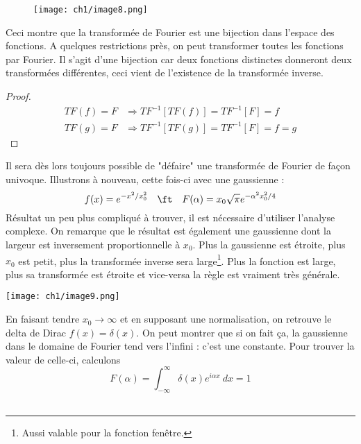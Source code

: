 \begin{wrapfigure}[6]{l}{5.5cm}
\vspace{-10mm}
\texttt{[image: ch1/image8.png]}
\end{wrapfigure}
Ceci montre que la transformée de Fourier est une bijection dans l'espace des fonctions. A 
quelques restrictions près, on peut transformer toutes les fonctions par Fourier. Il s'agit 
d'une bijection car deux fonctions distinctes donneront deux transformées différentes, ceci 
vient de l'existence de la transformée inverse. 
\begin{proof}\ \\
\begin{equation}
\begin{array}{ll}
TF(f) = F &\Longrightarrow TF^{-1}[TF(f)] = TF^{-1}[F] = f\\
TF(g) = F &\Longrightarrow TF^{-1}[TF(g)] = TF^{-1}[F] = f = g
\end{array}
\end{equation}
\end{proof}
Il sera dès lors toujours possible de "défaire" une transformée de Fourier de façon univoque. 
Illustrons à nouveau, cette fois-ci avec une gaussienne :
\begin{equation}
f(x) = e^{-x^2/x_0^2}\quad \ft \quad F(\alpha) = x_0\sqrt{\pi}e^{-\alpha^2x_0^2/4}
\end{equation}
Résultat un peu plus compliqué à trouver, il est nécessaire d'utiliser l’analyse complexe. On 
remarque que le résultat est également une gaussienne dont la largeur est inversement 
proportionnelle à $x_0$. Plus la gaussienne est étroite, plus $x_0$ est petit, plus la transformée 
inverse sera large\footnote{Aussi valable pour la fonction fenêtre.}.
Plus la fonction est large, plus sa transformée est étroite et vice-versa la règle est vraiment 
très générale.
\begin{center}
\texttt{[image: ch1/image9.png]}
\end{center}

En faisant tendre $x_0 \rightarrow \infty$ et en supposant une normalisation, on retrouve le delta de 
Dirac $f(x) = \delta(x)$. On peut montrer que si on fait ça, la gaussienne dans le domaine de 
Fourier tend vers l'infini : c'est une constante. Pour trouver la valeur de celle-ci, calculons
\begin{equation}
F(\alpha) = \int_{-\infty}^\infty \delta(x) e^{i\alpha x}\ dx = 1
\end{equation}\\

